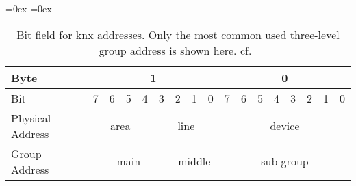 
\begin{table}[h]
	\aboverulesep=0ex
	\belowrulesep=0ex
	\renewcommand{\arraystretch}{1.2}
	
	\centering
	\begin{tabular}{|l|c|c|c|c|c|c|c|c|c|c|c|c|c|c|c|c|}
		\toprule
		Byte & \multicolumn{8}{c|}{1} & \multicolumn{8}{c|}{0} \\\midrule
		Bit & 7 & 6 & 5 & 4 & 3 & 2 & 1 & 0 & 7 & 6 & 5 & 4 & 3 & 2 & 1 & 0\\\midrule
		Physical Address & \multicolumn{4}{c|}{area} & \multicolumn{4}{c|}{line} & \multicolumn{8}{c|}{device}\\\midrule
		Group Address & \multicolumn{5}{c|}{main} & \multicolumn{3}{c|}{middle} & \multicolumn{8}{c|}{sub group}\\
		\bottomrule
	\end{tabular}
	\caption[Bit field for KNX addresses]{Bit field for \acs{knx} addresses. Only the most common used three-level group address is shown here. cf.~\textcite{Merz2009,Sokollik2017} }
	\label{tab:background:bas:knx:topo:addr}
\end{table}